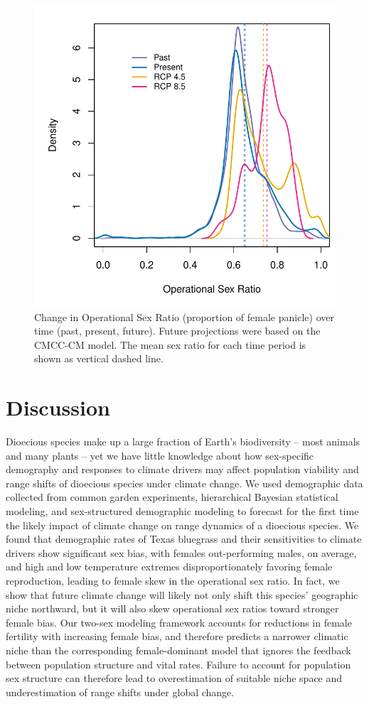 \documentclass[12pt]{article}\usepackage[]{graphicx}\usepackage[dvipsnames]{xcolor}
\begin{document}
\begin{figure}[H]
	\begin{center}
		\includegraphics[width=0.6\linewidth]{Figures/POAR_OSR.pdf}
		\caption{Change in Operational Sex Ratio (proportion of female panicle) over time (past, present, future).
			Future projections were based on the CMCC-CM model.
			The mean sex ratio for each time period is shown as vertical dashed line.}
		\label{fig:srprojcmc}
	\end{center}
\end{figure}



\section*{Discussion}
Dioecious species make up a large fraction of Earth's biodiversity -- most animals and many plants -- yet we have little knowledge about how sex-specific demography and responses to climate drivers may affect population viability and range shifts of dioecious species under climate change.
We used demographic data collected from common garden experiments, hierarchical Bayesian statistical modeling, and sex-structured demographic modeling to forecast for the first time the likely impact of climate change on range dynamics of a dioecious species.
We found that demographic rates of Texas bluegrass and their sensitivities to climate drivers show significant sex bias, with females out-performing males, on average, and high and low temperature extremes disproportionately favoring female reproduction, leading to female skew in the operational sex ratio. 
In fact, we show that future climate change will likely not only shift this species' geographic niche northward, but it will also skew operational sex ratios toward stronger female bias. 
Our two-sex modeling framework accounts for reductions in female fertility with increasing female bias, and therefore predicts a narrower climatic niche than the corresponding female-dominant model that ignores the feedback between population structure and vital rates. 
Failure to account for population sex structure can therefore lead to overestimation of suitable niche space and underestimation of range shifts under global change. 
\end{document}
